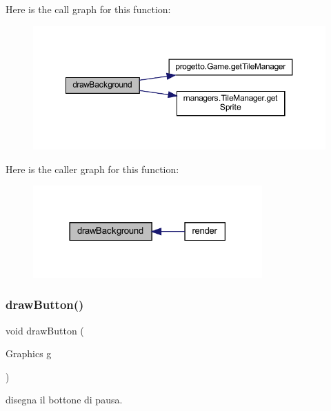 Here is the call graph for this function\+:
\nopagebreak
\begin{figure}[H]
\begin{center}
\leavevmode
\includegraphics[width=350pt]{classscenes_1_1_level3_a62bcb07be9e39896e5837a9d396e7235_cgraph}
\end{center}
\end{figure}
Here is the caller graph for this function\+:\nopagebreak
\begin{figure}[H]
\begin{center}
\leavevmode
\includegraphics[width=249pt]{classscenes_1_1_level3_a62bcb07be9e39896e5837a9d396e7235_icgraph}
\end{center}
\end{figure}
\mbox{\label{classscenes_1_1_level3_a65768678909bc0512c6cb9780709ad38}} 
\subsubsection{\texorpdfstring{draw\+Button()}{drawButton()}}
{\footnotesize\ttfamily void draw\+Button (\begin{DoxyParamCaption}\item[{Graphics}]{g }\end{DoxyParamCaption})\hspace{0.3cm}{\ttfamily [private]}}



disegna il bottone di pausa. 


